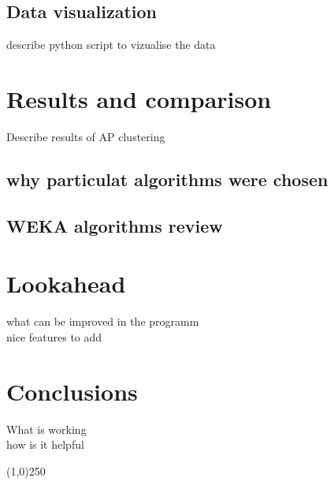 \documentclass[11pt, letterpaper]{article}            %
\begin{document}
\subsection{Data visualization}
describe python script to vizualise the data\\


\section{Results and comparison}
Describe results of AP clustering

\subsection{why particulat algorithms were chosen}
\subsection{WEKA algorithms review}

\section{Lookahead}
what can be improved in the programm\\
nice features to add\\

\section{Conclusions}
What is working\\
how is it helpful



\begin{center} \noindent \line(1,0){250} \end{center}	    %


\newpage								 								 %
{}

\end{document}
